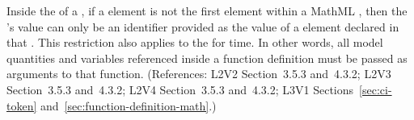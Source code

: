 Inside the  of a \FunctionDefinition, if a  element
is not the first element within a MathML , then the
's value can only be an identifier provided as the
value of a  element declared in that .
This restriction also applies to the  for time.
In other words, all model quantities and variables referenced
inside a function definition must be passed as arguments to that function.
(References: L2V2 Section~3.5.3 and~4.3.2; L2V3 Section~3.5.3 and~4.3.2;
L2V4 Section~3.5.3 and~4.3.2; L3V1 Sections~\ref{sec:ci-token} and~\ref{sec:function-definition-math}.)
